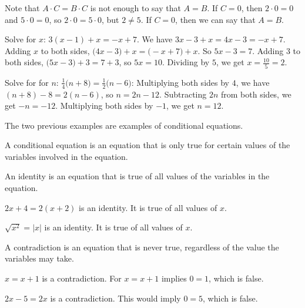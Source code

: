\documentclass[crop=false,class=book,oneside]{standalone}                      %
\begin{document}
        \begin{remark}
        Note that $A\cdot C = B\cdot C$ is not enough to say that $A=B$. If $C = 0$, then $2\cdot 0 = 0$ and $5\cdot 0 = 0$, so $2\cdot 0 = 5\cdot 0$, but $2\ne 5$. If $C = 0$, then we can say that $A=B$.
        \end{remark}
        \begin{example}
        Solve for $x$: $3(x-1) +x = -x+7$. We have $3x-3+x = 4x-3 = -x+7$. Adding $x$ to both sides, $\big(4x-3)+x = \big(-x+7)+x$. So $5x-3 = 7$. Adding $3$ to both sides, $\big(5x-3\big)+3 = 7+3$, so $5x = 10$. Dividing by $5$, we get $x = \frac{10}{5} = 2$.
        \end{example}
        \begin{example}
        Solve for for $n$: $\frac{1}{4}\big(n+8\big) = \frac{1}{2}\big(n-6\big)$: Multiplying both sides by $4$, we have $(n+8)-8 = 2(n-6)$, so $n = 2n-12$. Subtracting $2n$ from both sides, we get $-n = -12$. Multiplying both sides by $-1$, we get $n=12$.
        \end{example}
        The two previous examples are examples of conditional equations.
        \begin{definition}
        A conditional equation is an equation that is only true for certain values of the variables involved in the equation.
        \end{definition}
        \begin{definition}
        An identity is an equation that is true of all values of the variables in the equation.
        \end{definition}
        \begin{example}
        $2x + 4 = 2(x+2)$ is an identity. It is true of all values of $x$.
        \end{example}
        \begin{example}
        $\sqrt{x^2}=|x|$ is an identity. It is true of all values of $x$.
        \end{example}
        \begin{definition}
        A contradiction is an equation that is never true, regardless of the value the variables may take.
        \end{definition}
        \begin{example}
        $x=x+1$ is a contradiction. For $x = x+1$ implies $0=1$, which is false.
        \end{example}
        \begin{example}
        $2x - 5 = 2x$ is a contradiction. This would imply $0=5$, which is false.
        \end{example}
\end{document}
